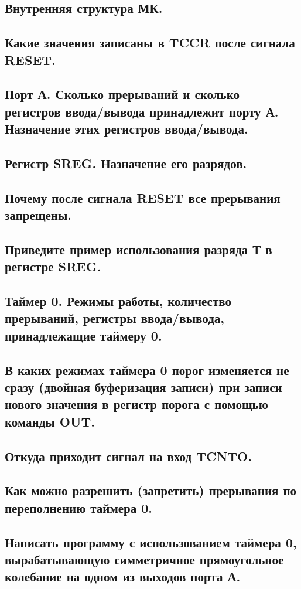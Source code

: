 \subsection{Внутренняя структура МК.}
\subsection{Какие значения записаны в TCCR после сигнала RESET.}
\subsection{Порт А. Сколько прерываний и сколько регистров ввода/вывода принадлежит порту А. Назначение этих регистров ввода/вывода.}
\subsection{Регистр SREG. Назначение его  разрядов.}
\subsection{Почему после сигнала RESET все прерывания запрещены.}
\subsection{Приведите пример использования разряда Т в регистре SREG.}
\subsection{Таймер 0. Режимы работы, количество прерываний, регистры ввода/вывода, принадлежащие таймеру 0.}
\subsection{В каких режимах таймера 0 порог изменяется не сразу (двойная буферизация записи) при записи нового значения в регистр порога с помощью команды OUT. }
\subsection{Откуда приходит сигнал на вход TCNTO.}
\subsection{Как можно разрешить (запретить) прерывания по переполнению таймера 0.}
\subsection{Написать программу с использованием таймера 0, вырабатывающую симметричное прямоугольное колебание на одном из выходов порта А.}
